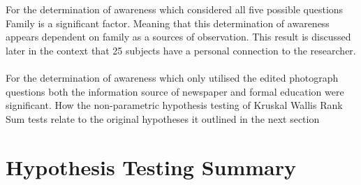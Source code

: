 For the determination of awareness which considered all five possible questions Family is a significant factor. Meaning that this determination of awareness appears dependent on family as a sources of observation. This result is discussed later in the context that 25 subjects have a personal connection to the researcher.
\paragraph{}
For the determination of awareness which only utilised the edited photograph questions both the information source of newspaper and formal education were significant. How the non-parametric hypothesis testing of Kruskal Wallis Rank Sum tests relate to the original hypotheses it outlined in the next section



\section{Hypothesis Testing Summary}


